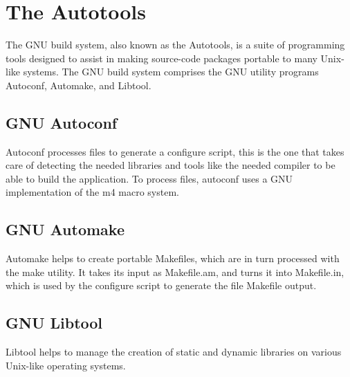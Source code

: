 
\section[The Autotools]{The Autotools\cite{website:autotools}}\label{sec:autotools}

The GNU build system, also known as the Autotools, is a suite of programming tools designed to assist in making source-code packages portable to many Unix-like systems. The GNU build system comprises the GNU utility programs Autoconf, Automake, and Libtool.

\subsection{GNU Autoconf}\label{sec:Autoconf}

Autoconf processes files to generate a configure script, this is the one that takes care of detecting the needed libraries and tools like the needed compiler to be able to build the application. To process files, autoconf uses a GNU implementation of the m4 macro system.

\subsection{GNU Automake}\label{sec:Automake}

Automake helps to create portable Makefiles, which are in turn processed with the make utility. It takes its input as Makefile.am, and turns it into Makefile.in, which is used by the configure script to generate the file Makefile output.

\subsection{GNU Libtool}\label{sec:Libtool}

Libtool helps to manage the creation of static and dynamic libraries on various Unix-like operating systems.
